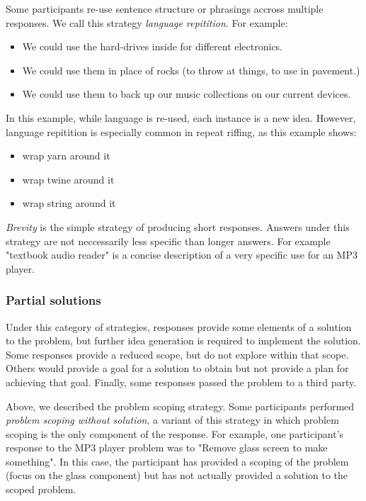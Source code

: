 Some participants re-use sentence structure or phrasings accross multiple responses. We call this strategy \emph{language repitition}. For example:

\begin{itemize}
    \item We could use the hard-drives inside for different electronics.
    \item We could use them in place of rocks (to throw at things, to use in pavement.)
    \item We could use them to back up our music collections on our current devices.
\end{itemize}

In this example, while language is re-used, each instance is a new idea.
However, language repitition is especially common in repeat riffing, as this example shows:

\begin{itemize}
    \item wrap yarn around it
    \item wrap twine around it
    \item wrap string around it
\end{itemize}

\emph{Brevity} is the simple strategy of producing short responses. Answers under this strategy are not neccessarily less specific than longer answers. For example "textbook audio reader" is a concise description of a very specific use for an MP3 player.

\subsubsection{Partial solutions}

Under this category of strategies, responses provide some elements of a solution to the problem, but further idea generation is required to implement the solution. Some responses provide a reduced scope, but do not explore within that scope. Others would provide a goal for a solution to obtain but not provide a plan for achieving that goal. Finally, some responses passed the problem to a third party.

Above, we described the problem scoping strategy. Some participants performed \emph{problem scoping without solution}, a variant of this strategy in which problem scoping is the only component of the response.
For example, one participant's response to the MP3 player problem was to "Remove glass screen to make something". In this case, the participant has provided a scoping of the problem (focus on the glass component) but has not actually provided a solution to the scoped problem.

